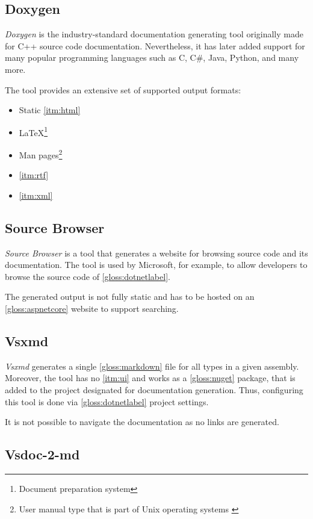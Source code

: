 \subsection{Doxygen}

\textit{Doxygen} is the industry-standard documentation generating tool originally made for C++ source code documentation. Nevertheless, it has later added support for many popular programming languages such as C, C\#, Java, Python, and many more.

The tool provides an extensive set of supported output formats:
\begin{itemize}
    \item Static \ref{itm:html}
    \item \LaTeX\footnote{Document preparation system}
    \item Man pages\footnote{User manual type that is part of Unix operating systems \cite{credocs_limited_latex_2022}}
    \item \ref{itm:rtf}
    \item \ref{itm:xml}
\end{itemize}

\subsection{Source Browser}

\textit{Source Browser} is a tool that generates a website for browsing source code and its documentation. The tool is used by Microsoft, for example, to allow developers to browse the source code of \ref{gloss:dotnetlabel}.

The generated output is not fully static and has to be hosted on an \ref{gloss:aspnetcore} website to support searching.

\subsection{Vsxmd} \label{ssec:vsxmd}

\textit{Vsxmd} generates a single \ref{gloss:markdown} file for all types in a given assembly. Moreover, the tool has no \ref{itm:ui} and works as a \ref{gloss:nuget} package, that is added to the project designated for documentation generation. Thus, configuring this tool is done via \ref{gloss:dotnetlabel} project settings.

It is not possible to navigate the documentation as no links are generated.

\subsection{Vsdoc-2-md}

